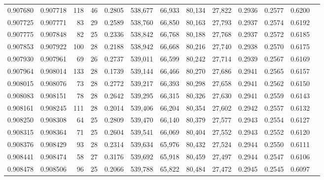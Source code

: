 \begin{tabular}{rrrrrrrrrrrrr}
0.907680 & 0.907718 &   118 &  46 &                                     0.2805 & 538,677 &  66,933 &  80,134 &  27,822 & 0.2936 & 0.2577 & 0.6200 \\
0.907725 & 0.907771 &    83 &  29 &                                     0.2589 & 538,760 &  66,850 &  80,163 &  27,793 & 0.2937 & 0.2574 & 0.6192 \\
0.907775 & 0.907848 &    82 &  25 &                                     0.2336 & 538,842 &  66,768 &  80,188 &  27,768 & 0.2937 & 0.2572 & 0.6185 \\
0.907853 & 0.907922 &   100 &  28 &                                     0.2188 & 538,942 &  66,668 &  80,216 &  27,740 & 0.2938 & 0.2570 & 0.6175 \\
0.907930 & 0.907961 &    69 &  26 &                                     0.2737 & 539,011 &  66,599 &  80,242 &  27,714 & 0.2939 & 0.2567 & 0.6169 \\
0.907964 & 0.908014 &   133 &  28 &                                     0.1739 & 539,144 &  66,466 &  80,270 &  27,686 & 0.2941 & 0.2565 & 0.6157 \\
0.908015 & 0.908076 &    73 &  28 &                                     0.2772 & 539,217 &  66,393 &  80,298 &  27,658 & 0.2941 & 0.2562 & 0.6150 \\
0.908083 & 0.908151 &    78 &  28 &                                     0.2642 & 539,295 &  66,315 &  80,326 &  27,630 & 0.2941 & 0.2559 & 0.6143 \\
0.908161 & 0.908245 &   111 &  28 &                                     0.2014 & 539,406 &  66,204 &  80,354 &  27,602 & 0.2942 & 0.2557 & 0.6132 \\
0.908250 & 0.908308 &    64 &  25 &                                     0.2809 & 539,470 &  66,140 &  80,379 &  27,577 & 0.2943 & 0.2554 & 0.6127 \\
0.908315 & 0.908364 &    71 &  25 &                                     0.2604 & 539,541 &  66,069 &  80,404 &  27,552 & 0.2943 & 0.2552 & 0.6120 \\
0.908376 & 0.908429 &    93 &  28 &                                     0.2314 & 539,634 &  65,976 &  80,432 &  27,524 & 0.2944 & 0.2550 & 0.6111 \\
0.908441 & 0.908474 &    58 &  27 &                                     0.3176 & 539,692 &  65,918 &  80,459 &  27,497 & 0.2944 & 0.2547 & 0.6106 \\
0.908478 & 0.908506 &    96 &  25 &                                     0.2066 & 539,788 &  65,822 &  80,484 &  27,472 & 0.2945 & 0.2545 & 0.6097 \\

\end{tabular}

